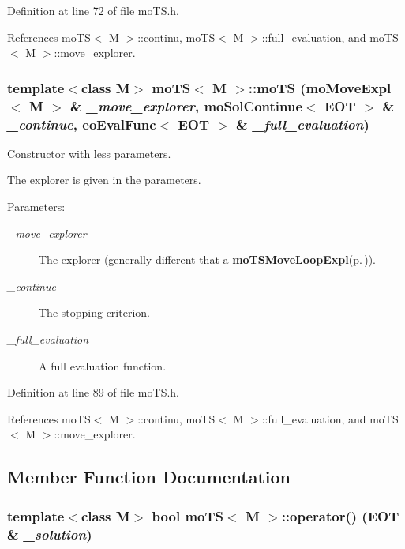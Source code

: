 Definition at line 72 of file mo\-TS.h.

References mo\-TS$<$ M $>$::continu, mo\-TS$<$ M $>$::full\_\-evaluation, and mo\-TS$<$ M $>$::move\_\-explorer.
\subsubsection{\setlength{\rightskip}{0pt plus 5cm}template$<$class M$>$ {\bf mo\-TS}$<$ M $>$::{\bf mo\-TS} ({\bf mo\-Move\-Expl}$<$ M $>$ \& {\em \_\-move\_\-explorer}, {\bf mo\-Sol\-Continue}$<$ {\bf EOT} $>$ \& {\em \_\-continue}, {\bf eo\-Eval\-Func}$<$ {\bf EOT} $>$ \& {\em \_\-full\_\-evaluation})\hspace{0.3cm}{\tt  [inline]}}\label{classmo_t_s_a1}


Constructor with less parameters. 

The explorer is given in the parameters.

\begin{Desc}
\item[Parameters:]
\begin{description}
\item[{\em \_\-move\_\-explorer}]The explorer (generally different that a {\bf mo\-TSMove\-Loop\-Expl}{\rm (p.\,\pageref{classmo_t_s_move_loop_expl})}). \item[{\em \_\-continue}]The stopping criterion. \item[{\em \_\-full\_\-evaluation}]A full evaluation function. \end{description}
\end{Desc}


Definition at line 89 of file mo\-TS.h.

References mo\-TS$<$ M $>$::continu, mo\-TS$<$ M $>$::full\_\-evaluation, and mo\-TS$<$ M $>$::move\_\-explorer.

\subsection{Member Function Documentation}
\subsubsection{\setlength{\rightskip}{0pt plus 5cm}template$<$class M$>$ bool {\bf mo\-TS}$<$ M $>$::operator() ({\bf EOT} \& {\em \_\-solution})\hspace{0.3cm}{\tt  [inline]}}\label{classmo_t_s_a2}


